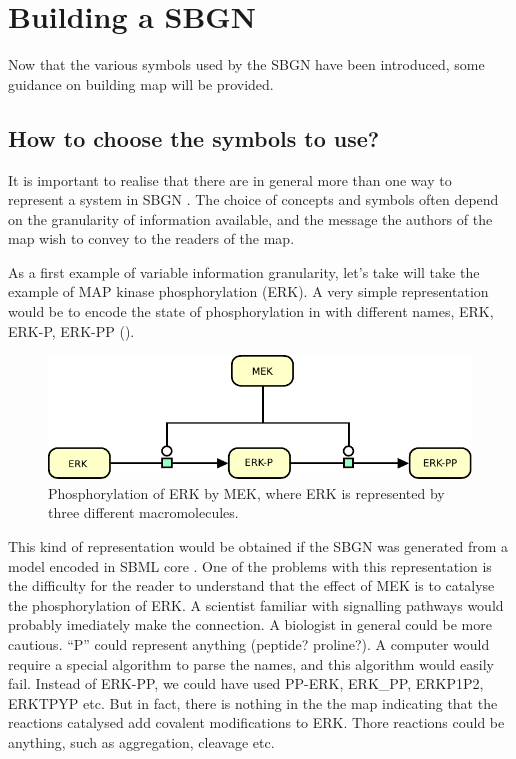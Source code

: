 \section{Building a SBGN \PDm}
\label{chp:build}

Now that the various symbols used by the SBGN \PDl have been introduced, some guidance on building map will be provided. 

\subsection{How to choose the symbols to use?}
\label{sec:choose}

It is important to realise that there are in general more than one way to represent a system in SBGN \PD. The choice of concepts and symbols often depend on the granularity of information available, and the message the authors of the map wish to convey to the readers of the map. 

As a first example of variable information granularity, let's take will take the example of MAP kinase phosphorylation (ERK). A very simple representation would be to encode the state of phosphorylation in  with different names, ERK, ERK-P, ERK-PP ().
 
\begin{figure}[H]
  \centering
  \includegraphics[scale = 1]{le_images/MAPK-NoVar}
  \caption{Phosphorylation of ERK by MEK, where ERK is represented by three different macromolecules.}
  \label{fig:MAPK-NoVar}
\end{figure}

This kind of representation would be obtained if the SBGN \PDm was generated from a model encoded in SBML core \cite{Hucka:2003}. One of the problems with this representation is the difficulty for the reader to understand that the effect of MEK is to catalyse the phosphorylation of ERK. A scientist familiar with signalling pathways would probably imediately make the connection. A biologist in general could be more cautious. ``P'' could represent anything (peptide? proline?). A computer would require a special algorithm to parse the names, and this algorithm would easily fail. Instead of ERK-PP, we could have used PP-ERK, ERK\_PP, ERKP1P2, ERKTPYP etc. But in fact, there is nothing in the the map  indicating that the reactions catalysed add covalent modifications to ERK. Thore reactions could be anything, such as aggregation, cleavage etc.

